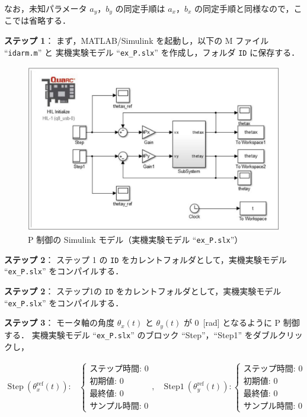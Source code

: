 なお，未知パラメータ $a_y$，$b_y$ の同定手順は $a_x$，$b_x$ の同定手順と同様なので，ここでは省略する．

\noindent
\textbf{ステップ 1}：
まず，MATLAB/Simulink を起動し，以下の M ファイル ``\texttt{idarm.m}'' と
実機実験モデル ``\texttt{ex\_P.slx}'' を作成し，フォルダ \texttt{\textyen ID} に保存する．

\begin{figure}[htbp]
    \centering
    \includegraphics[width=0.9\linewidth]{figure/step2_model.pdf}
    \caption{P 制御の Simulink モデル（実機実験モデル ``\texttt{ex\_P.slx}''）}
    \label{fig:simulink_model_p}
\end{figure}

\vspace{1em}
\noindent
\textbf{ステップ 2}：
ステップ 1 の \texttt{\textyen ID} をカレントフォルダとして，実機実験モデル ``\texttt{ex\_P.slx}'' をコンパイルする．

\vspace{1em}
\noindent
\textbf{ステップ 2}：
ステップ1の \texttt{\textyen ID} をカレントフォルダとして，実機実験モデル ``\texttt{ex\_P.slx}'' をコンパイルする．

\vspace{1em}
\noindent
\textbf{ステップ 3}：
モータ軸の角度 $\theta_x(t)$ と $\theta_y(t)$ が $0$~[rad] となるように P 制御する．
実機実験モデル ``\texttt{ex\_P.slx}'' のブロック ``Step''，``Step1'' をダブルクリックし，

\[ 
\begin{array}{ll}
\text{Step}~(\theta_x^{\mathrm{ref}}(t))\!: &
\left\{
\begin{array}{l}
\text{ステップ時間: } 0 \\
\text{初期値: } 0 \\
\text{最終値: } 0 \\
\text{サンプル時間: } 0
\end{array}
\right., \quad
\text{Step1}~(\theta_y^{\mathrm{ref}}(t))\!: 
\left\{
\begin{array}{l}
\text{ステップ時間: } 0 \\
\text{初期値: } 0 \\
\text{最終値: } 0 \\
\text{サンプル時間: } 0
\end{array}
\right.
\end{array}
\]

